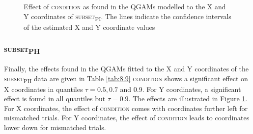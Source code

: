 \begin{figure}
    \centering
    
    \caption{Effect of \textsc{condition} as found in the QGAMs modelled to the X and Y coordinates of \textsc{subset\textsubscript{PI}}. The lines indicate the confidence intervals of the estimated X and Y coordinate values}
    \label{fig:8_5}
\end{figure}

\subsubsection{\textsc{subset\textsubscript{PH}}}\label{section08_2_2_4}

Finally, the effects found in the QGAMs fitted to the X and Y coordinates of the \textsc{subset\textsubscript{PH}} data are given in Table \ref{tab:8.9} \textsc{condition} shows a significant effect on X coordinates in quantiles $\tau=0.5,0.7$ and $0.9$. For Y coordinates, a significant effect is found in all quantiles but $\tau=0.9$. The effects are illustrated in Figure \ref{fig:8_5}. For X coordinates, the effect of \textsc{condition} comes with coordinates further left for mismatched trials. For Y coordinates, the effect of \textsc{condition} leads to coordinates lower down for mismatched trials.

